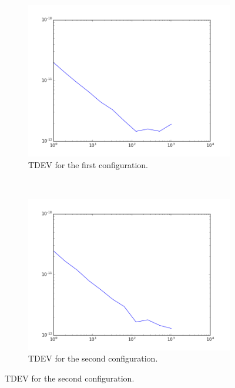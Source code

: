 \begin{figure}
    \begin{subfigure}[t]{.45\textwidth}
        \centering
        \includegraphics[width=\textwidth]{img/pps_p1.png}
        \caption{TDEV for the first configuration.}
        \label{fig:pps_p1}
    \end{subfigure}
    ~
    \begin{subfigure}[t]{.45\textwidth}
        \centering
        \includegraphics[width=\textwidth]{img/pps_p2.png}
        \caption{TDEV for the second configuration.}
        \label{fig:pps_p2}
    \end{subfigure}
    

\end{figure}
